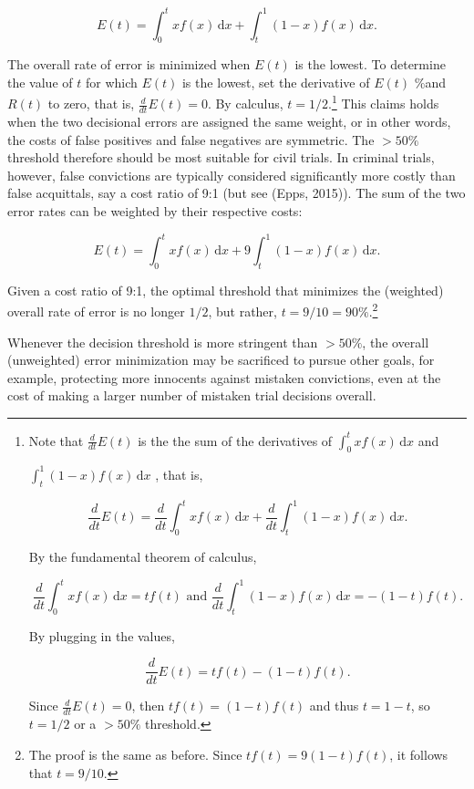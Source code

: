 \documentclass[10pt,dvipsnames,enabledeprecatedfontcommands]{scrartcl}
\begin{document}
\[E(t) = \int_0^t \! x f(x) \, \mathrm{d}x + \int_t^1 \! (1-x) f(x) \, \mathrm{d}x.
\]

The overall rate of error is minimized when \(E(t)\) is the lowest. To
determine the value of \(t\) for which \(E(t)\) is the lowest, set the
derivative of \(E(t)\) \%and \(R(t)\) to zero, that is,
\(\frac{d}{dt} E(t)= 0\). By calculus,
\(t=1/2\).\footnote{Note that $\frac{d}{dt}  E(t)$ is the the sum of the derivatives of $\int_0^t \! x f(x) \, \mathrm{d}x$ 
and 

$\int_t^1 \!(1-x) f(x) \, \mathrm{d}x$
, that is,

\[\frac{d}{dt} E(t) = \frac{d}{dt}  \int_0^t \! x f(x) \, \mathrm{d}x + \frac{d}{dt}  \int_t^1 \! (1-x) f(x) \, \mathrm{d}x.\]

By the fundamental theorem of calculus, 

\[\frac{d}{dt}   \int_0^t \! x f(x) \, \mathrm{d}x = tf(t) \text{ and }
\frac{d}{dt}   \int_t^1 \! (1-x) f(x) \, \mathrm{d}x = -(1-t)f(t). \]

By plugging in the values, 

\[\frac{d}{dt}  E(t) = tf(t)  -(1-t)f(t). \]

Since $\frac{d}{dt}  E(t)= 0$, then $tf(t)  = (1-t)f(t)$
and thus
$t  = 1-t$, so 
$t  = 1/2$ or a $>50\%$ threshold.
} This claims holds when the two decisional errors are assigned the same
weight, or in other words, the costs of false positives and false
negatives are symmetric. The \(>50\%\) threshold therefore should be
most suitable for civil trials. In criminal trials, however, false
convictions are typically considered significantly more costly than
false acquittals, say a cost ratio of 9:1 (but see (Epps, 2015)). The
sum of the two error rates can be weighted by their respective costs:

\[E(t) = \int_0^t \! x f(x) \, \mathrm{d}x + 9\int_t^1 \! (1-x) f(x) \, \mathrm{d}x.
\]

Given a cost ratio of 9:1, the optimal threshold that minimizes the
(weighted) overall rate of error is no longer \(1/2\), but rather,
\(t=9/10=90\%\).\footnote{The proof is the same as before. Since $tf(t)  = 9(1-t)f(t)$, it follows that 
$t  = 9/10$.}

Whenever the decision threshold is more stringent than \(>50\%\), the
overall (unweighted) error minimization may be sacrificed to pursue
other goals, for example, protecting more innocents against mistaken
convictions, even at the cost of making a larger number of mistaken
trial decisions overall.
\end{document}

